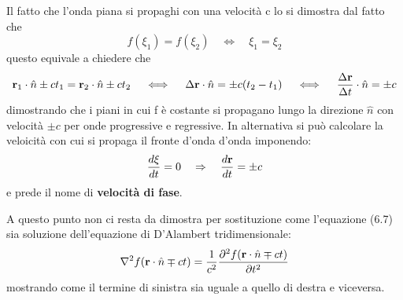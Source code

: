 Il fatto che l'onda piana si propaghi con una velocit\`a c lo si dimostra dal fatto che 
\begin{equation*}
	f(\xi_{1}) = f(\xi_{2}) \quad \iff \quad \xi_{1} = \xi_{2} 
\end{equation*}
questo equivale a chiedere che 
\begin{equation*}
	\bold{r}_{1} \cdot \hat{n} \pm ct_{1} = \bold{r}_{2} \cdot \hat{n} \pm ct_{2} \quad \iff \quad \Delta \bold{r} \cdot \hat{n} = \pm c(t_{2}-t_{1}) \quad \iff \quad \frac{\Delta \bold{r}}{\Delta t} \cdot \hat{n} =  \pm c
\end{equation*}
dimostrando che i piani in cui f \`e costante si propagano lungo la direzione $\hat{n}$ con velocit\`a $\pm c $ per onde progressive e regressive. In alternativa si pu\`o calcolare la veloicit\`a con cui si propaga il fronte d'onda d'onda imponendo: 
\begin{equation*}
	\frac{d \xi }{dt} = 0 \quad \Rightarrow \quad \frac{d \bold{r}}{dt} = \pm c
\end{equation*}
e prede il nome di \textbf{velocit\`a di fase}.

A questo punto non ci resta da dimostra per sostituzione come l'equazione (6.7) sia soluzione dell'equazione di D'Alambert tridimensionale:
\begin{equation*}
	\nabla^2 f(\bold{r} \cdot \hat{n} \mp ct) =\frac{1}{c^2}\frac{\partial^2 f(\bold{r} \cdot \hat{n} \mp ct)}{\partial t^2} 
\end{equation*}
mostrando come il termine di sinistra sia uguale a quello di destra e viceversa.

